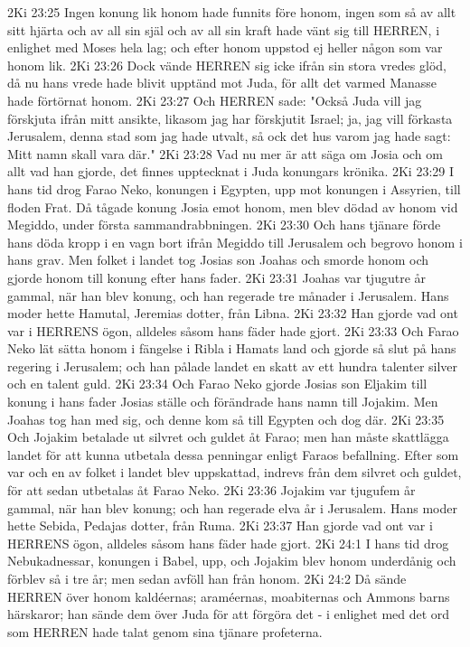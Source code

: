 2Ki 23:25  Ingen konung lik honom hade funnits före honom, ingen som så av allt sitt hjärta och av all sin själ och av all sin kraft hade vänt sig till HERREN, i enlighet med Moses hela lag; och efter honom uppstod ej heller någon som var honom lik.
2Ki 23:26  Dock vände HERREN sig icke ifrån sin stora vredes glöd, då nu hans vrede hade blivit upptänd mot Juda, för allt det varmed Manasse hade förtörnat honom.
2Ki 23:27  Och HERREN sade: "Också Juda vill jag förskjuta ifrån mitt ansikte, likasom jag har förskjutit Israel; ja, jag vill förkasta Jerusalem, denna stad som jag hade utvalt, så ock det hus varom jag hade sagt: Mitt namn skall vara där."
2Ki 23:28  Vad nu mer är att säga om Josia och om allt vad han gjorde, det finnes upptecknat i Juda konungars krönika.
2Ki 23:29  I hans tid drog Farao Neko, konungen i Egypten, upp mot konungen i Assyrien, till floden Frat. Då tågade konung Josia emot honom, men blev dödad av honom vid Megiddo, under första sammandrabbningen.
2Ki 23:30  Och hans tjänare förde hans döda kropp i en vagn bort ifrån Megiddo till Jerusalem och begrovo honom i hans grav. Men folket i landet tog Josias son Joahas och smorde honom och gjorde honom till konung efter hans fader.
2Ki 23:31  Joahas var tjugutre år gammal, när han blev konung, och han regerade tre månader i Jerusalem. Hans moder hette Hamutal, Jeremias dotter, från Libna.
2Ki 23:32  Han gjorde vad ont var i HERRENS ögon, alldeles såsom hans fäder hade gjort.
2Ki 23:33  Och Farao Neko lät sätta honom i fängelse i Ribla i Hamats land och gjorde så slut på hans regering i Jerusalem; och han pålade landet en skatt av ett hundra talenter silver och en talent guld.
2Ki 23:34  Och Farao Neko gjorde Josias son Eljakim till konung i hans fader Josias ställe och förändrade hans namn till Jojakim. Men Joahas tog han med sig, och denne kom så till Egypten och dog där.
2Ki 23:35  Och Jojakim betalade ut silvret och guldet åt Farao; men han måste skattlägga landet för att kunna utbetala dessa penningar enligt Faraos befallning. Efter som var och en av folket i landet blev uppskattad, indrevs från dem silvret och guldet, för att sedan utbetalas åt Farao Neko.
2Ki 23:36  Jojakim var tjugufem år gammal, när han blev konung; och han regerade elva år i Jerusalem. Hans moder hette Sebida, Pedajas dotter, från Ruma.
2Ki 23:37  Han gjorde vad ont var i HERRENS ögon, alldeles såsom hans fäder hade gjort.
2Ki 24:1  I hans tid drog Nebukadnessar, konungen i Babel, upp, och Jojakim blev honom underdånig och förblev så i tre år; men sedan avföll han från honom.
2Ki 24:2  Då sände HERREN över honom kaldéernas; araméernas, moabiternas och Ammons barns härskaror; han sände dem över Juda för att förgöra det - i enlighet med det ord som HERREN hade talat genom sina tjänare profeterna.
